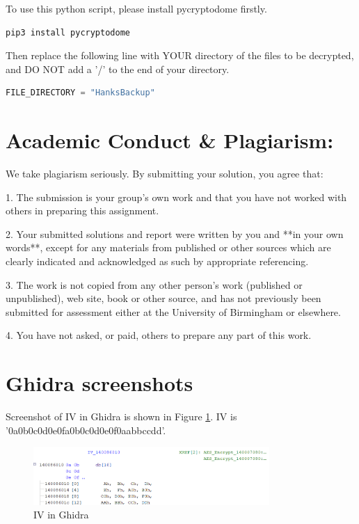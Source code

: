 \documentclass[11pt]{article}
\begin{document}
To use this python script, please install pycryptodome firstly.
\begin{lstlisting}
pip3 install pycryptodome
\end{lstlisting}

Then replace the following line with YOUR directory of the files to be decrypted, and DO NOT add a '/' to the end of your directory.
\begin{lstlisting}[language=python]
FILE_DIRECTORY = "HanksBackup"
\end{lstlisting}


\section*{Academic Conduct \& Plagiarism:}
We take plagiarism seriously. By submitting your solution, you agree that:

1. The submission is your group's own work and that you have not worked with others in preparing this assignment.

2. Your submitted solutions and report were written by you and **in your own words**, except for any materials from published or other sources which are clearly indicated and acknowledged as such by appropriate referencing.

3. The work is not copied from any other person's work (published or unpublished), web site, book or other source, and has not previously been submitted for assessment either at the University of Birmingham or elsewhere.

4. You have not asked, or paid, others to prepare any part of this work.

\newpage
\appendix
\section{Ghidra screenshots}

Screenshot of IV in Ghidra is shown in Figure \ref{fig:IV}. IV is '0a0b0c0d0e0fa0b0c0d0e0f0aabbccdd'.
\begin{figure}[htbp]
    \centering
    \includegraphics[width=0.8\textwidth]{img/IV.png}
    \caption{IV in Ghidra}
    \label{fig:IV}
\end{figure}
\end{document}
